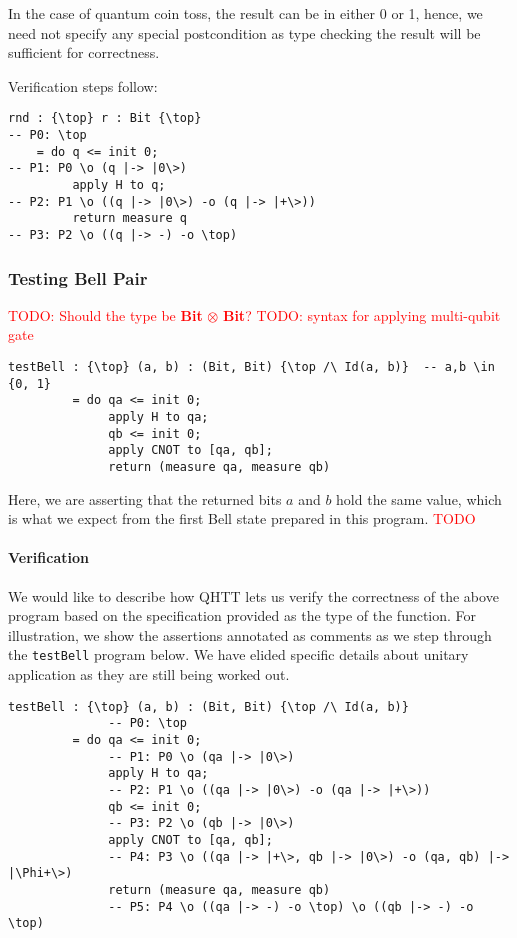 \documentclass[acmsmall,nonacm,timestamp,review=false,anonymous=false]{acmart}
\newcommand{\type}[1]{\textrm{\textbf{#1}}}
\newcommand{\todo}[1]{\textcolor{red}{#1}}
\begin{document}
In the case of quantum coin toss, the result can be in either 0 or 1, hence, we need not specify any special postcondition as type checking the result will be sufficient for correctness.

Verification steps follow:

\begin{minipage}{0.95\linewidth}
\begin{lstlisting}[language=QHaskell]
rnd : {\top} r : Bit {\top}
-- P0: \top
    = do q <= init 0;
-- P1: P0 \o (q |-> |0\>)
         apply H to q;
-- P2: P1 \o ((q |-> |0\>) -o (q |-> |+\>))
         return measure q
-- P3: P2 \o ((q |-> -) -o \top)
\end{lstlisting}
\end{minipage}

\subsubsection{Testing Bell Pair}
\leavevmode
\todo{TODO: Should the type be \type{Bit} $\otimes$ \type{Bit}?}
\todo{TODO: syntax for applying multi-qubit gate}

\begin{minipage}{0.95\linewidth}
\begin{lstlisting}[language=QHaskell]
testBell : {\top} (a, b) : (Bit, Bit) {\top /\ Id(a, b)}  -- a,b \in {0, 1}
         = do qa <= init 0;
              apply H to qa;
              qb <= init 0;
              apply CNOT to [qa, qb];
              return (measure qa, measure qb)
\end{lstlisting}
\end{minipage}

Here, we are asserting that the returned bits $a$ and $b$ hold the same value, which is what we expect from the first Bell state prepared in this program. \todo{TODO}

\paragraph{Verification}
We would like to describe how QHTT lets us verify the correctness of the above program based on the specification provided as the type of the function. For illustration, we show the assertions annotated as comments as we step through the \texttt{testBell} program below. We have elided specific details about unitary application as they are still being worked out.

\begin{lstlisting}[language=QHaskell]
testBell : {\top} (a, b) : (Bit, Bit) {\top /\ Id(a, b)}
              -- P0: \top
         = do qa <= init 0;
              -- P1: P0 \o (qa |-> |0\>)
              apply H to qa;
              -- P2: P1 \o ((qa |-> |0\>) -o (qa |-> |+\>))
              qb <= init 0;
              -- P3: P2 \o (qb |-> |0\>)
              apply CNOT to [qa, qb];
              -- P4: P3 \o ((qa |-> |+\>, qb |-> |0\>) -o (qa, qb) |-> |\Phi+\>)
              return (measure qa, measure qb)
              -- P5: P4 \o ((qa |-> -) -o \top) \o ((qb |-> -) -o \top)
\end{lstlisting}
\end{document}
